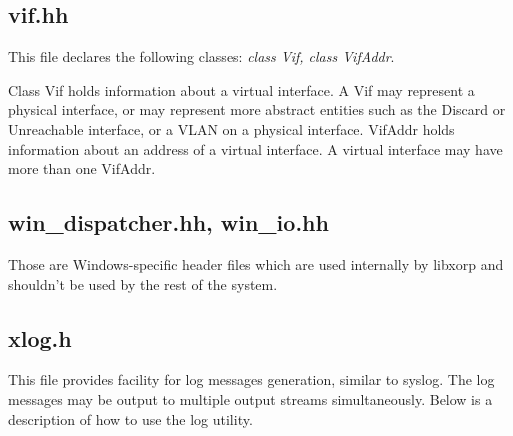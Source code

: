 \documentclass[11pt]{article}
\begin{document}
\subsection{vif.hh}

This file declares the following classes: \emph{class Vif, class
VifAddr}.

Class Vif holds information about a virtual interface.  A Vif may
represent a physical interface, or may represent more abstract
entities such as the Discard or Unreachable interface, or a VLAN on a
physical interface.
VifAddr holds information about an address of a virtual interface.
A virtual interface may have more than one VifAddr.

\subsection{win\_dispatcher.hh, win\_io.hh}

Those are Windows-specific header files which are used internally by
libxorp and shouldn't be used by the rest of the system.

\subsection{xlog.h}

This file provides facility for log messages generation, similar to
syslog. The log messages may be output to multiple output streams
simultaneously. Below is a description of how to use the log utility.
\end{document}
